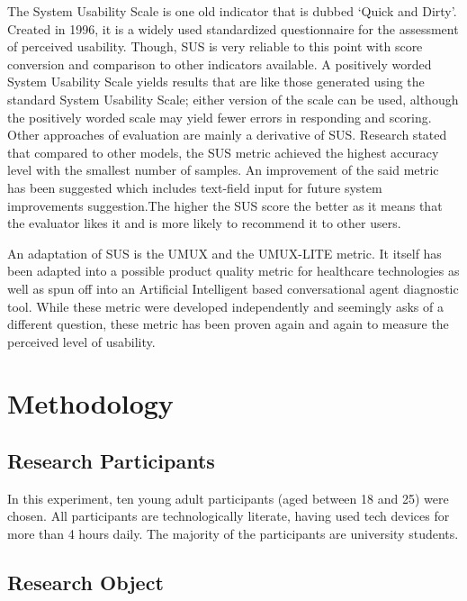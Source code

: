 \documentclass[conference]{IEEEtran}
\begin{document}
The System Usability Scale is one old indicator that is dubbed `Quick and Dirty'\cite{Khalid}. Created in 1996, it is a widely used standardized questionnaire for the assessment of perceived usability\cite{JamesRLewis2018}. Though, SUS is very reliable to this point with score conversion and comparison to other indicators available\cite{Lewis2018MeasuringPU, Lewis2018ItemBF}. A positively worded System Usability Scale yields results that are like those generated using the standard System Usability Scale\cite{Kortum2021IsIT}; either version of the scale can be used, although the positively worded scale may yield fewer errors in responding and scoring\cite{Kortum2021IsIT}. Other approaches of evaluation are mainly a derivative of SUS\@. Research stated that compared to other models, the SUS metric achieved the highest accuracy level with the smallest number of samples\cite{Souza2019UserEE}. An improvement of the said metric has been suggested which includes text-field input for future system improvements suggestion\cite{Harper2021APS}.The higher the SUS score the better as it means that the evaluator likes it and is more likely to recommend it to other users\cite{Gramedia, Drew}.

An adaptation of SUS is the UMUX and the UMUX-LITE metric. It itself has been adapted into a possible product quality metric for healthcare technologies\cite{Borsci2019IsTL} as well as spun off into an Artificial Intelligent based conversational agent diagnostic tool\cite{Borsci2022TheCU}. While these metric were developed independently and seemingly asks of a different question, these metric has been proven again and again to measure the perceived level of usability\cite{Lewis2018MeasuringPU, Berkman2016ReassessingTU, Lewis2019MeasuringPU}.

\section{Methodology}

\subsection{Research Participants}

In this experiment, ten young adult participants (aged between 18 and 25) were chosen. All participants are technologically literate, having used tech devices for more than 4 hours daily. The majority of the participants are university students.

\subsection{Research Object}
\end{document}
